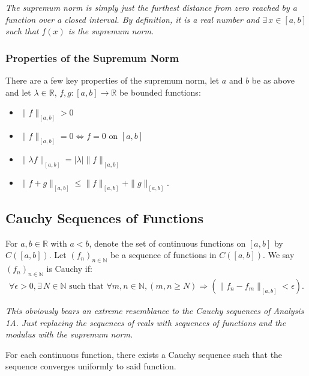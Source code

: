 \documentclass[a4paper, 12pt, twoside]{article}
\begin{document}
\textit{The supremum norm is simply just the furthest distance from
      zero reached by a function over a closed interval. By definition,
      it is a real number and $\exists\,x \in [a, b]$ such that $f(x)$ is
      the supremum norm.}

\subsubsection{Properties of the Supremum Norm}

There are a few key properties of the supremum norm, let $a$ and $b$
be as above and let $\lambda \in \mathbb{R}$, $f, g:[a, b]\to\mathbb{R}$
be bounded functions:

\begin{itemize}
      \item $\|f\|_{[a,b]} > 0$
      \item $\|f\|_{[a,b]} = 0 \Leftrightarrow f = 0 \text{ on } [a, b]$
      \item $\|\lambda f\|_{[a,b]} = |\lambda|\|f\|_{[a,b]}$
      \item $\|f+g\|_{[a,b]} \leq \|f\|_{[a,b]} + \|g\|_{[a,b]}.$
\end{itemize}

\subsection{Cauchy Sequences of Functions}

For $a, b \in \mathbb{R}$ with $a < b$, denote the set of continuous functions
on $[a,b]$ by $C([a,b])$. Let $(f_n)_{n\in \mathbb{N}}$ be a sequence of
functions in $C([a,b])$. We say $(f_n)_{n\in \mathbb{N}}$ is Cauchy if:
\begin{align*}
      \forall \epsilon > 0, \exists\,N \in \mathbb{N} \text{ such that }
      \forall m, n \in \mathbb{N}, (m, n \geq N) \Rightarrow (\|f_n - f_m\|_{[a,b]} <
      \epsilon).
\end{align*}

\textit{This obviously bears an extreme resemblance to the Cauchy sequences of
      Analysis 1A. Just replacing the sequences of reals with sequences of functions
      and the modulus with the supremum norm.}

\vspace{\baselineskip}

For each continuous function, there exists a Cauchy sequence such that the
sequence converges uniformly to said function.

\newpage
\end{document}
